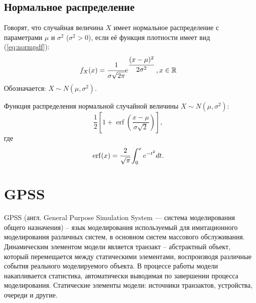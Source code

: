 \subsection{Нормальное распределение}
Говорят, что случайная величина $X$ имеет нормальное распределение с параметрами $\mu$ и $\sigma^2$ ($\sigma^2 > 0$), если её функция плотности имеет вид (\ref{eq:normpdf}):
\begin{equation}\label{eq:normpdf}
	f_{X}(x) = \cfrac{1}{\sigma\sqrt{2\pi}}e^{\cfrac{(x - \mu)^2}{2\sigma^2}}\;, x \in \mathbb{R}
\end{equation}
Обозначается: $X\sim N(\mu, \sigma^2)$.

Функция распределения нормальной случайной величины $X\sim N(\mu, \sigma^2)$:
\begin{equation}\label{eq:normcdf}
	\frac {1}{2}\left[1+\operatorname {erf} \left({\frac {x-\mu }{\sigma {\sqrt {2}}}}\right)\right],
\end{equation}
где
\begin{equation}\label{eq:erf}
	\operatorname {erf} (x)=\cfrac {2}{\sqrt {\pi}}\int_{0}^{x}e^{-t^2}dt.
\end{equation}

\section{GPSS}

GPSS (англ. General Purpose Simulation System — система моделирования общего назначения) -- язык моделирования используемый для имитационного моделирования различных систем, в основном систем массового обслуживания. Динамическим элементом модели является транзакт -- абстрактный объект, который перемещается между статическими элементами,
воспроизводя различные события реального моделируемого объекта. В процессе работы модели накапливается статистика, автоматически выводимая по завершении процесса моделирования. Статические элементы модели: источники транзактов, устройства, очереди и другие.